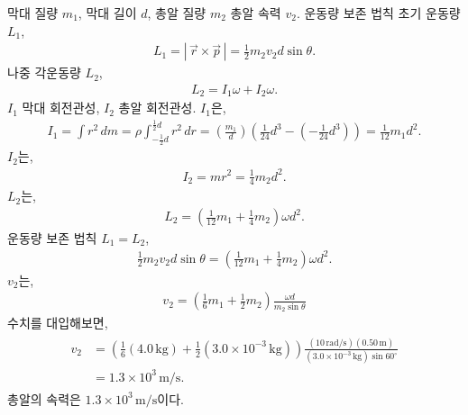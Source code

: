 \documentclass[floatfix,nofootinbib,superscriptaddress,fleqn]{revtex4-2}
\begin{document}
막대 질량 $m_1$, 막대 길이 $d$, 총알 질량 $m_2$ 총알 속력 $v_2$.
운동량 보존 법칙 초기 운동량 $L_1$,
\begin{align}
  L_1 =|\,\vec{r}\times\vec{p}\,|=\frac{1}{2} m_2v_2d\sin\theta.
\end{align}
나중 각운동량 $L_2$,
\begin{align}
  L_2 = I_1\omega+ I_2\omega.
\end{align}
$I_1$ 막대 회전관성, $I_2$ 총알 회전관성. $I_1$은,
\begin{align}
  I_1 = \int r^2\,dm = \rho\int_{-\frac{1}{2}d} ^{\frac{1}{2}d}r^2\,dr
  =\left(\frac{m_1}{d}\right)\left(\frac{1}{24}d^3
  -\left(-\frac{1}{24}d^3\right)\right)
  =\frac{1}{12}m_1d^2.
\end{align}
$I_2$는,
\begin{align}
  I_2 =  mr^2 = \frac{1}{4}m_2d^2.
\end{align}
$L_2$는,
\begin{align}
  L_2 = \left(\frac{1}{12}m_1+\frac{1}{4}m_2\right)\omega d^2.
\end{align}
운동량 보존 법칙 $L_1=L_2$,
\begin{align}
  \frac{1}{2}m_2v_2d\sin\theta=\left(\frac{1}{12}m_1
  +\frac{1}{4}m_2\right)\omega d^2.
\end{align}
$v_2$는,
\begin{align}
  v_2 = \left(\frac{1}{6}m_1+\frac{1}{2}m_2\right)\frac{\omega d}{m_2\sin\theta}
\end{align}
수치를 대입해보면,
\begin{align}
  \begin{split}
    v_2 &= \left(\frac{1}{6}(4.0\,\mathrm{kg})
    +\frac{1}{2}(3.0\times 10^{-3}\,\mathrm{kg})\right)
    \frac{(10\,\mathrm{rad/s}) (0.50\,\mathrm{m})}
    {(3.0\times 10^{-3}\,\mathrm{kg})\sin{60^\circ}}  \\
    &= 1.3\times 10^3\,\mathrm{m/s}.
  \end{split}
\end{align}
총알의 속력은 $1.3\times 10^3\,\mathrm{m/s}$이다.
\vspace{1.cm}
\end{document}
